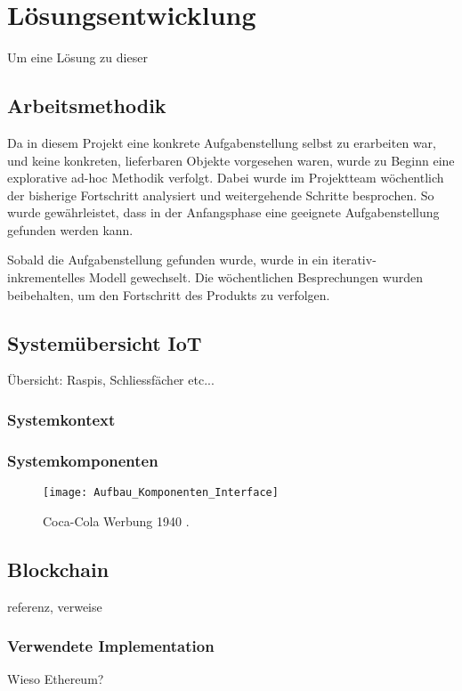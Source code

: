 \chapter{Lösungsentwicklung}
\label{cha:Lösungsentwicklung}
Um eine Lösung zu dieser 

\section{Arbeitsmethodik}
Da in diesem Projekt eine konkrete Aufgabenstellung selbst zu erarbeiten war, und keine konkreten, lieferbaren Objekte vorgesehen waren, wurde zu Beginn eine explorative ad-hoc Methodik verfolgt. Dabei wurde im Projektteam wöchentlich der bisherige Fortschritt analysiert und weitergehende Schritte besprochen. So wurde gewährleistet, dass in der Anfangsphase eine geeignete Aufgabenstellung gefunden werden kann.
\par
Sobald die Aufgabenstellung gefunden wurde, wurde in ein iterativ- inkrementelles Modell gewechselt. Die wöchentlichen Besprechungen wurden beibehalten, um den Fortschritt des Produkts zu verfolgen.

\section{Systemübersicht IoT}
\label{sec:Setup_IoT}
Übersicht: Raspis, Schliessfächer etc...
\subsection{Systemkontext}

\subsection{Systemkomponenten}

\begin{figure}
\centering
\texttt{[image: Aufbau\_Komponenten\_Interface]} %
\caption{Coca-Cola Werbung 1940 \cite{CocaCola1940}.}
\label{fig:CocaCola}
\end{figure}



\section{Blockchain}
\label{sec:Blockchain}
referenz, verweise

\subsection{Verwendete Implementation}
Wieso Ethereum?

